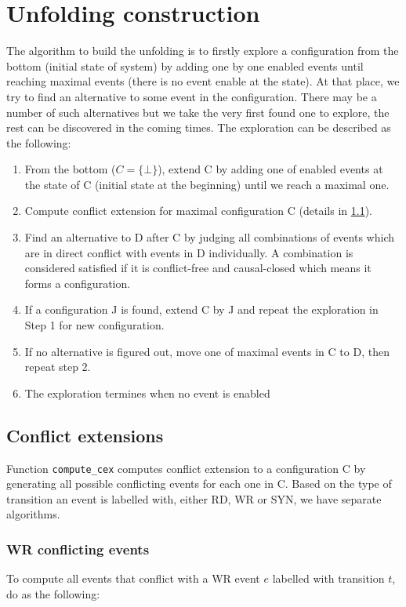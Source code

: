 \documentclass{llncs}
\begin{document}
\section{Unfolding construction}
The algorithm to build the unfolding is to firstly explore a configuration from the bottom (initial state of system) by adding one by one enabled events until reaching maximal events (there is no event enable at the state). At that place, we try to find an alternative to some event in the configuration. There may be a number of such alternatives but we take the very first found one to explore, the rest can be discovered in the coming times.
The exploration can be described as the following: 
\begin{enumerate}
\item 
	From the bottom ($C = \{\bot\}$), extend C by adding one of enabled events at the state of C (initial state at the beginning) until we reach a maximal one.
\item
	Compute conflict extension for maximal configuration C (details in \cref{s:cex}).
\item
	Find an alternative to D after C by judging all combinations of events which are in direct conflict with
	events in D individually. A combination is considered satisfied if it is conflict-free and causal-closed which means it
	forms a configuration.
\item
	If a configuration J is found, extend C by J and repeat the exploration in Step 1 for new configuration.
\item
	If no alternative is figured out, move one of maximal events in C to D, then repeat step 2.
\item
	The exploration termines when no event is enabled
\end{enumerate}

\subsection{Conflict extensions}
\label{s:cex}
Function \verb!compute_cex! computes conflict extension to a configuration C by generating all possible conflicting events for each one in C. Based on the type of transition an event is labelled with, either RD, WR or SYN, we have separate algorithms. 
\subsubsection{WR conflicting events}
\label{ss:cex_wr}
\noindent
To compute all events that conflict with a WR event $e$ labelled with transition $t$, do as the following:
\end{document}
